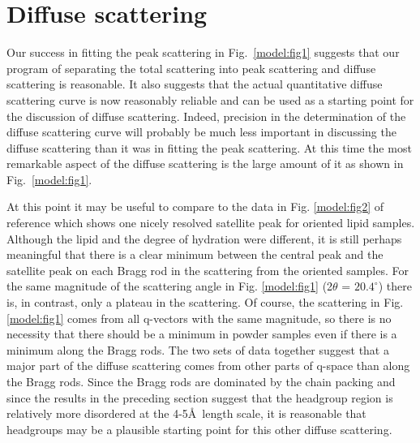 \section{Diffuse scattering}
\label{gel_model_diff}

Our success in fitting the peak scattering in Fig.\ \ref{model:fig1} suggests that
our program of separating the total scattering into peak scattering
and diffuse scattering is reasonable.  It also suggests that the
actual quantitative diffuse scattering curve is now reasonably
reliable and can be used as a starting point for the discussion
of diffuse scattering.  Indeed, precision in the determination of 
the diffuse scattering curve will probably be much less important in
discussing the diffuse scattering than it was in fitting the peak scattering.
At this time the most remarkable aspect of the
diffuse scattering is the large amount of it as shown in Fig.\ \ref{model:fig1}.  

At this point it may be useful to compare to the data in Fig. \ref{model:fig2}
of reference \cite{Smi88}
which shows one nicely resolved satellite peak for oriented lipid samples.
Although the lipid and the degree of hydration were different, it is
still perhaps meaningful that there is a clear minimum between the central
peak and the satellite peak on each Bragg rod in the scattering
from the oriented samples.  For the same magnitude of the scattering angle
in Fig. \ref{model:fig1} (2$\theta$ = $20.4^{\circ}$) there is, in contrast,
only a plateau in the
scattering.  Of course, the scattering in Fig. \ref{model:fig1}
comes from all q-vectors
with the same magnitude, so there is no necessity that there should be
a minimum in powder samples even if there is a minimum along the
Bragg rods.  The two sets of data together suggest that a major
part of the diffuse scattering comes from other parts of q-space than
along the Bragg rods.  Since the Bragg rods are dominated by the
chain packing and
since the results in the preceding section suggest that the headgroup
region is relatively more disordered at the 4-5\AA~length scale,
it is reasonable that headgroups may be a
plausible starting point for this other diffuse scattering.

